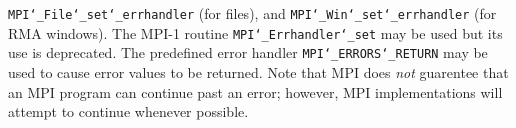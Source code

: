 {\tt MPI{\tt \char`\_}File{\tt \char`\_}set{\tt \char`\_}errhandler} (for files), and {\tt MPI{\tt \char`\_}Win{\tt \char`\_}set{\tt \char`\_}errhandler} (for
RMA windows).  The MPI-1 routine {\tt MPI{\tt \char`\_}Errhandler{\tt \char`\_}set} may be used but
its use is deprecated.  The predefined error handler
{\tt MPI{\tt \char`\_}ERRORS{\tt \char`\_}RETURN} may be used to cause error values to be returned.
Note that MPI does {\em not} guarentee that an MPI program can continue past
an error; however, MPI implementations will attempt to continue whenever
possible.
\par
{}
\endmanpage
